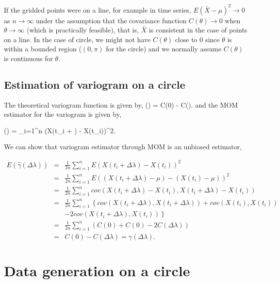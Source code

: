 If the gridded points were on a line, for example in time series, $E(\bar{X} - \mu)^2 \to 0$ as $n \to \infty$ under the assumption that the covariance function $C(\theta) \to 0$ when $\theta \to \infty$ (which is practically feasible), that is, $\bar{X}$ is consistent in the case of points on a line. In the case of circle, we might not have $C(\theta)$ close to 0 since $\theta$ is within a bounded region ($(0, \pi)$ for the circle) and we normally assume $C(\theta)$ is continuous for $\theta$. \\

\subsection{Estimation of variogram on a circle}

The theoretical variogram function is given by,
\beq
\gamma(\theta) = C(0) - C(\theta).
\eeq
 and the MOM estimator for the variogram is given by,

\beq
\hat{\gamma}(\Delta \lambda) =  \sum_{i=1}^n (X(t_i + \Delta \lambda) - X(t_i))^2.
\eeq

We can show that variogram estimator through MOM is an unbiased estimator, 

\begin{eqnarray*}
E(\hat{\gamma}(\Delta \lambda)) &=& \frac{1}{2n} \sum_{i = 1}^n E(X(t_i + \Delta \lambda) - X(t_i))^2 \\
&=& \frac{1}{2n} \sum_{i = 1}^n E((X(t_i + \Delta \lambda)-\mu) - (X(t_i) - \mu))^2 \\
&=& \frac{1}{2n} \sum_{i = 1}^n cov(X(t_i + \Delta \lambda) - X(t_i), X(t_i + \Delta \lambda) - X(t_i)) \\
&=& \frac{1}{2n} \sum_{i = 1}^n \left\{ cov(X(t_i + \Delta \lambda), X(t_i + \Delta \lambda)) + cov(X(t_i), X(t_i)) \right. \\
& & \left. - 2cov(X(t_i + \Delta \lambda), X(t_i)) \right\}\\
&=& \frac{1}{2n} \sum_{i = 1}^n \left( C(0) + C(0) - 2C(\Delta \lambda)\right) \\
&=& C(0) - C(\Delta \lambda) = \gamma(\Delta \lambda).
\end{eqnarray*}
% 


\section{Data generation on a circle}

